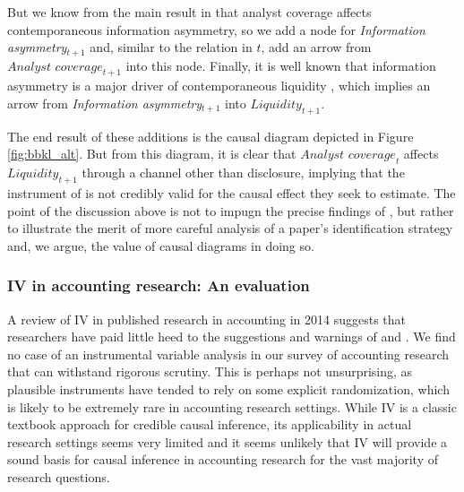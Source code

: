 \documentclass[11pt,reqno,titlepage]{amsart}
\begin{document}
\begin{doublespace}
But we know from the main result in \citet{Kelly:2012ih} that analyst coverage affects contemporaneous information asymmetry, so we add a node for \textit{Information asymmetry}$_{t+1}$ and, similar to the relation in $t$, add an arrow from $\textit{Analyst coverage}_{t+1}$ into this node.
Finally, it is well known that information asymmetry is a major driver of contemporaneous liquidity \citep{Glosten:1988gd}, which implies an arrow from \emph{Information asymmetry}$_{t+1}$ into $\textit{Liquidity}_{t+1}$.

The end result of these additions is the causal diagram depicted in Figure \ref{fig:bbkl_alt}.
But from this diagram, it is clear that $\textit{Analyst coverage}_t$ affects $\textit{Liquidity}_{t+1}$ through a channel other than disclosure, implying that the instrument of \citet{Balakrishnan:2014js} is not credibly valid for the causal effect they seek to estimate. 
The point of the discussion above is not to impugn the precise findings of \citet{Balakrishnan:2014js}, but rather to illustrate the merit of more careful analysis of a paper's identification strategy and, we argue, the value of causal diagrams in doing so.

\subsubsection{IV in accounting research: An evaluation}
A review of IV in published research in accounting in 2014 suggests that researchers have paid little heed to the suggestions and warnings of  \citet{Larcker:2010fq} and \citet{Roberts:2013cz}.
We find no case of an instrumental variable analysis in our survey of accounting research that can withstand rigorous scrutiny.
This is perhaps not unsurprising, as plausible instruments have tended to rely on some explicit randomization, which is likely to be extremely rare in accounting research settings.
While IV is a classic textbook approach for credible causal inference, its applicability in actual research settings seems very limited and it seems unlikely that IV will provide a sound basis for causal inference in accounting research for the vast majority of research questions.
 

\end{doublespace}
\end{document}
